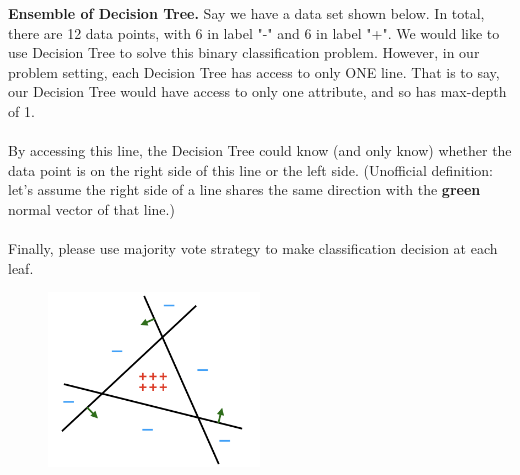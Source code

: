 \documentclass[11pt,addpoints,answers]{exam}
\numberwithin{equation}{section} %
\numberwithin{figure}{section} %
\numberwithin{table}{section} %
\begin{document}
\begin{questions}
    
    \question[3] \textbf{Ensemble of Decision Tree.} Say we have a data set shown below. In total, there are 12 data points, with 6 in label "-" and 6 in label "+". We would like to use Decision Tree to solve this binary classification problem. However, in our problem setting, each Decision Tree has access to only ONE line. That is to say, our Decision Tree would have access to only one attribute, and so has max-depth of 1. \\ \\
    By accessing this line, the Decision Tree could know (and only know) whether the data point is on the right side of this line or the left side. (Unofficial definition: let's assume the right side of a line shares the same direction with the \textcolor{OliveGreen}{\textbf{green}} normal vector of that line.) \\ \\
    Finally, please use majority vote strategy to make classification decision at each leaf.\\
    
    \begin{figure}[H]
        \centering
        \includegraphics[width = 0.5\textwidth]{ensemble_dt.png}
        \label{Q_ensemble_DT}
    \end{figure}
    

\end{questions}
\end{document}
